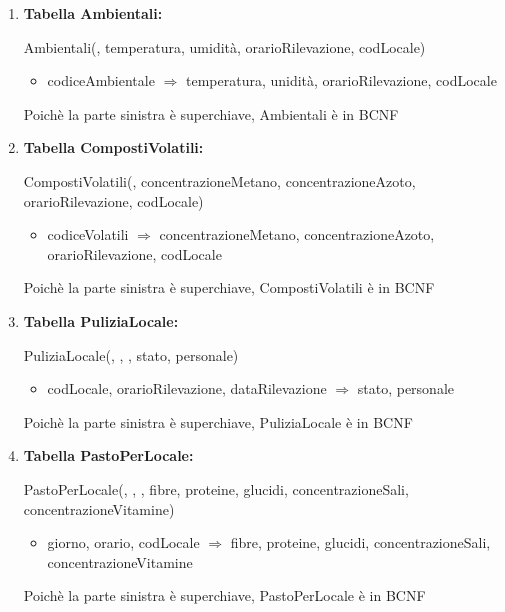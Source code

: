 \documentclass[12pt,a4paper]{article}
\begin{document}
\begin{enumerate}
\item[] \textbf{Tabella Ambientali:}

Ambientali(\underline{}, temperatura, umidità,  orarioRilevazione,  codLocale)
\begin{itemize}
\vspace{-5pt}
\item codiceAmbientale $\Rightarrow$ temperatura, unidità, orarioRilevazione, codLocale
\vspace{-5pt}
\end{itemize}
Poichè la parte sinistra è superchiave, Ambientali è in BCNF
\vspace{10pt}



\item[] \textbf{Tabella CompostiVolatili:}

CompostiVolatili(\underline{}, concentrazioneMetano, concentrazioneAzoto,  orarioRilevazione, codLocale)
\begin{itemize}
\vspace{-5pt}
\item codiceVolatili $\Rightarrow$ concentrazioneMetano, concentrazioneAzoto, orarioRilevazione, codLocale
\vspace{-5pt}
\end{itemize}
Poichè la parte sinistra è superchiave, CompostiVolatili è in BCNF
\vspace{10pt}



\item[] \textbf{Tabella PuliziaLocale:}

PuliziaLocale(\underline{}, \underline{}, \underline{}, stato, personale)
\begin{itemize}
\vspace{-5pt}
\item codLocale, orarioRilevazione, dataRilevazione $\Rightarrow$ stato, personale
\vspace{-5pt}
\end{itemize}
Poichè la parte sinistra è superchiave, PuliziaLocale è in BCNF
\vspace{10pt}



\item[] \textbf{Tabella PastoPerLocale:}

PastoPerLocale(\underline{}, \underline{},  \underline{},  fibre,  proteine,  glucidi,  concentrazioneSali,  concentrazioneVitamine)
\begin{itemize}
\vspace{-5pt}
\item giorno, orario, codLocale $\Rightarrow$ fibre, proteine, glucidi, concentrazioneSali, concentrazioneVitamine
\vspace{-5pt}
\end{itemize}
Poichè la parte sinistra è superchiave, PastoPerLocale è in BCNF
\vspace{10pt}




\end{enumerate}
\end{document}
